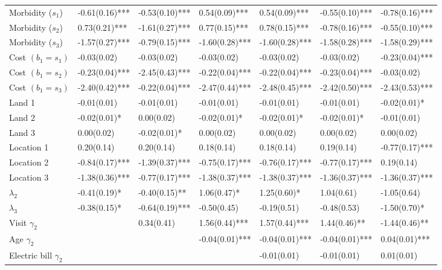 \begin{tabular}{lllllll}
  Morbidity ($s_1$) & -0.61(0.16)*** & -0.53(0.10)*** &  0.54(0.09)*** &  0.54(0.09)*** & -0.55(0.10)*** & -0.78(0.16)*** \\ 
  Morbidity ($s_2$) &  0.73(0.21)*** & -1.61(0.27)*** &  0.77(0.15)*** &  0.78(0.15)*** & -0.78(0.16)*** & -0.55(0.10)*** \\ 
  Morbidity ($s_3$) & -1.57(0.27)*** & -0.79(0.15)*** & -1.60(0.28)*** & -1.60(0.28)*** & -1.58(0.28)*** & -1.58(0.29)*** \\ 
  Cost $(b_1 = s_1)$ & -0.03(0.02)    & -0.03(0.02)    & -0.03(0.02)    & -0.03(0.02)    & -0.03(0.02)    & -0.23(0.04)*** \\ 
  Cost $(b_1 = s_2)$ & -0.23(0.04)*** & -2.45(0.43)*** & -0.22(0.04)*** & -0.22(0.04)*** & -0.23(0.04)*** & -0.03(0.02)    \\ 
  Cost $(b_1 = s_3)$ & -2.40(0.42)*** & -0.22(0.04)*** & -2.47(0.44)*** & -2.48(0.45)*** & -2.42(0.50)*** & -2.43(0.53)*** \\ 
  Land 1 & -0.01(0.01)    & -0.01(0.01)    & -0.01(0.01)    & -0.01(0.01)    & -0.01(0.01)    & -0.02(0.01)*   \\ 
  Land 2 & -0.02(0.01)*   &  0.00(0.02)    & -0.02(0.01)*   & -0.02(0.01)*   & -0.02(0.01)*   & -0.01(0.01)    \\ 
  Land 3 &  0.00(0.02)    & -0.02(0.01)*   &  0.00(0.02)    &  0.00(0.02)    &  0.00(0.02)    &  0.00(0.02)    \\ 
  Location 1 &  0.20(0.14)    &  0.20(0.14)    &  0.18(0.14)    &  0.18(0.14)    &  0.19(0.14)    & -0.77(0.17)*** \\ 
  Location 2 & -0.84(0.17)*** & -1.39(0.37)*** & -0.75(0.17)*** & -0.76(0.17)*** & -0.77(0.17)*** &  0.19(0.14)    \\ 
  Location 3 & -1.38(0.36)*** & -0.77(0.17)*** & -1.38(0.37)*** & -1.38(0.37)*** & -1.36(0.37)*** & -1.36(0.37)*** \\ 
  $\lambda_{2}$ & -0.41(0.19)*   & -0.40(0.15)**  &  1.06(0.47)*   &  1.25(0.60)*   &  1.04(0.61)    & -1.05(0.64)    \\ 
  $\lambda_{3}$ & -0.38(0.15)*   & -0.64(0.19)*** & -0.50(0.45)    & -0.19(0.51)    & -0.48(0.53)    & -1.50(0.70)*   \\ 
  Visit $\gamma_{2}$ &  &  0.34(0.41)    &  1.56(0.44)*** &  1.57(0.44)*** &  1.44(0.46)**  & -1.44(0.46)**  \\ 
  Age $\gamma_{2}$ &  &  & -0.04(0.01)*** & -0.04(0.01)*** & -0.04(0.01)*** &  0.04(0.01)*** \\ 
  Electric bill $\gamma_{2}$ &  &  &  & -0.01(0.01)    & -0.01(0.01)    &  0.01(0.01)    \\ 

\end{tabular}
